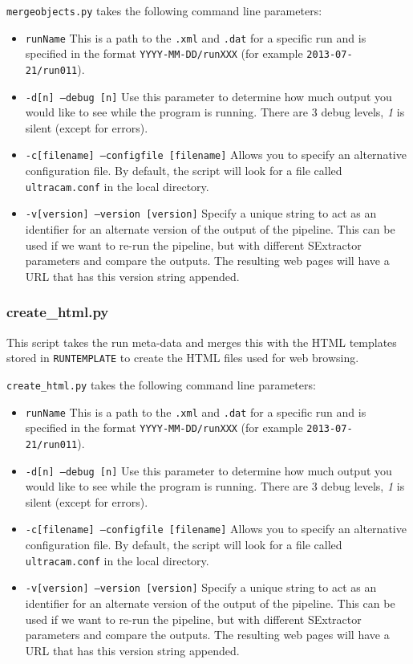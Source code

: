 \texttt{mergeobjects.py} takes the following command line parameters:
\begin{itemize}
  \item \texttt{runName} This is a path to the \texttt{.xml} and \texttt{.dat} for a specific run and is specified in the format \texttt{YYYY-MM-DD/runXXX}  (for example \texttt{2013-07-21/run011}).
  \item \texttt{-d[n] --debug [n]} Use this parameter to determine how much output you would like to see while the program is running. There are 3 debug levels, \emph{1} is silent (except for errors).
  \item \texttt{-c[filename] --configfile [filename]} Allows you to specify an alternative configuration file. By default, the script will look for a file called \texttt{ultracam.conf} in the local directory. 
  \item \texttt{-v[version] --version [version]} Specify a unique string to act as an identifier for an alternate version of the output of the pipeline. This can be used if we want to re-run the pipeline, but with different SExtractor parameters and compare the outputs. The resulting web pages will have a URL that has this version string appended.    
\end{itemize}

\subsubsection{create\_html.py}
This script takes the run meta-data and merges this with the HTML templates stored in \texttt{RUNTEMPLATE} to create the HTML files used for web browsing. 

\texttt{create\_html.py} takes the following command line parameters:
\begin{itemize}
  \item \texttt{runName} This is a path to the \texttt{.xml} and \texttt{.dat} for a specific run and is specified in the format \texttt{YYYY-MM-DD/runXXX}  (for example \texttt{2013-07-21/run011}).
  \item \texttt{-d[n] --debug [n]} Use this parameter to determine how much output you would like to see while the program is running. There are 3 debug levels, \emph{1} is silent (except for errors).
  \item \texttt{-c[filename] --configfile [filename]} Allows you to specify an alternative configuration file. By default, the script will look for a file called \texttt{ultracam.conf} in the local directory. 
  \item \texttt{-v[version] --version [version]} Specify a unique string to act as an identifier for an alternate version of the output of the pipeline. This can be used if we want to re-run the pipeline, but with different SExtractor parameters and compare the outputs. The resulting web pages will have a URL that has this version string appended.    
\end{itemize}

